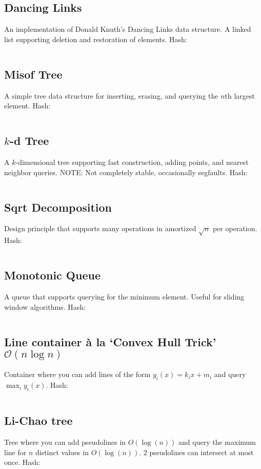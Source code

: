 \documentclass[9pt,a4paper,landscape,oneside]{amsart}
\newcommand{\mintedstyle}[2]{\inputminted{#1}{code/#2}}
\newcommand{\code}[1]{ Hash: 
\mintedstyle{cpp}{#1}}
\begin{document}
\begin{multicols*}{3}
\subsection{Dancing Links}
An implementation of Donald Knuth's Dancing Links data structure. A
linked list supporting deletion and restoration of elements.
\code{datastructures/dancing_links.cpp}

\subsection{Misof Tree}
A simple tree data structure for inserting, erasing, and querying the
$n$th largest element.
\code{datastructures/misof_tree.cpp}

\subsection{$k$-d Tree}
A $k$-dimensional tree supporting fast construction, adding points, and
nearest neighbor queries.
NOTE: Not completely stable, occasionally segfaults.
\code{datastructures/kd_tree.cpp}

\subsection{Sqrt Decomposition}
Design principle that supports many operations in amortized $\sqrt{n}$ per operation.
\code{datastructures/sqrt_decomposition.cpp}

\subsection{Monotonic Queue}
A queue that supports querying for the minimum element. Useful for sliding window algorithms.
\code{datastructures/monotonic_queue.cpp}

\subsection{Line container \`{a} la `Convex Hull Trick' $\mathcal{O}(n \log n)$}
\label{sect:cht}
Container where you can add lines of the form $y_i(x) = k_i x + m_i$ and query $\max_{i} y_i(x)$.
\code{datastructures/LineContainer.cpp}

\subsection{Li-Chao tree}
\label{sect:lct}
Tree where you can add pseudolines in $O(\log(n))$ and query the maximum line for $n$ distinct values in $O(\log(n))$. 2 pseudolines can intersect at most once.
\code{datastructures/Li_Chao_tree.cpp}


\end{multicols*}
\end{document}

